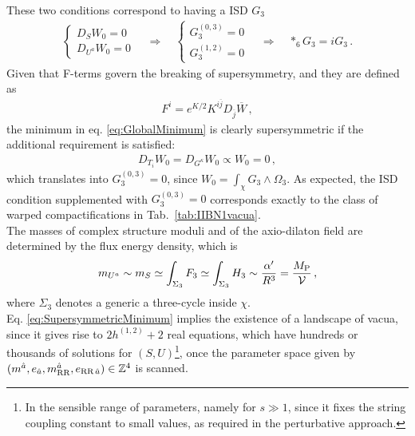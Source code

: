 \documentclass[12pt,a4paper]{book}
\newcommand{\V}{{\cal{V}}}
\begin{document}
These two conditions correspond to having a ISD $G_3$
\begin{align}
\label{eq:SupersymmetricMinimum}
\left\{\begin{matrix} D_S W_0 = 0 \\ D_{U^a} W_0 = 0 \end{matrix}\right. \quad \Rightarrow \quad \left\{\begin{matrix} G_{3}^{(0,3)} = 0 \\ G_{3}^{(1,2)} = 0 \end{matrix}\right. \quad \Rightarrow \quad *_6 G_3 = i G_3\,.
\end{align}
Given that F-terms govern the breaking of supersymmetry, and they are defined as
\begin{align}
\label{eq:FTermsDefinition}
F^i = e^{K/2} K^{i \overline{j}} D_{\overline{j}} \overline{W} \,,
\end{align}
the minimum in eq. \eqref{eq:GlobalMinimum} is clearly supersymmetric if the additional requirement is satisfied:
\begin{align}
\label{eq:Vanishing03Component}
D_{T_i} W_0 = D_{G^\kappa} W_0 \propto W_0 = 0 \,,
\end{align}
which translates into $G_3^{(0,3)} = 0$, since $W_0 = \int_\chi G_3 \wedge \Omega_3$. As expected, the ISD condition supplemented with $G_3^{(0,3)} = 0$ corresponds exactly to the class of warped compactifications in Tab.~\ref{tab:IIBN1vacua}.\\

The masses of complex structure moduli and of the axio-dilaton field are determined by the flux energy density, which is
\begin{align}
\label{eq:FluxesMasses}
m_{U^a} \sim m_S \simeq \int_{\Sigma_3} F_3 \simeq \int_{\Sigma_3} H_3 \sim \frac{\alpha'}{R^3} = \frac{M_{\rm P}}{\V} \,,
\end{align}
where $\Sigma_3$ denotes a generic a three-cycle inside $\chi$.\\

Eq. \eqref{eq:SupersymmetricMinimum} implies the existence of a landscape of vacua, since it gives rise to $2 h^{(1,2)} + 2$ real equations, which have hundreds or thousands of solutions for $(S,U)$\footnote{In the sensible range of parameters, namely for $s \gg 1$, since it fixes the string coupling constant to small values, as required in the perturbative approach.}, once the parameter space given by $(m^{\hat{a}}, e_{\hat{a}}, m_{\rm RR}^{\hat{a}}, e_{\text{RR}\, \hat{a}}) \in \mathbb{Z}^4$ is scanned.\\
\end{document}
